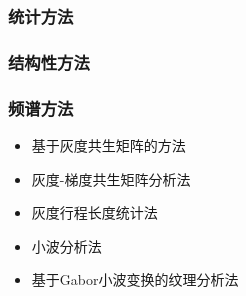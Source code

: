 \subsubsection{统计方法}

\subsubsection{结构性方法}

\subsubsection{频谱方法}


\begin{itemize}
\item 基于灰度共生矩阵的方法
\item 灰度-梯度共生矩阵分析法
\item 灰度行程长度统计法
\item 小波分析法
\item 基于Gabor小波变换的纹理分析法
\end{itemize}